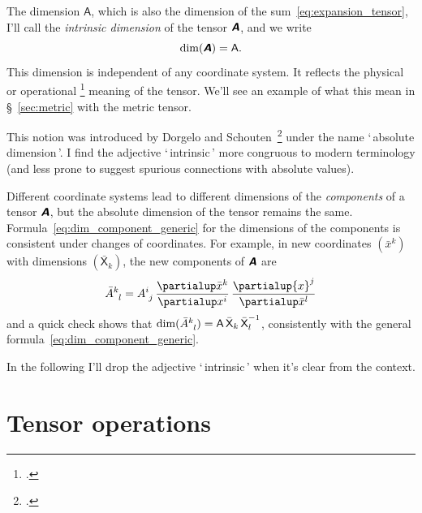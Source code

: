 \documentclass[\ifafour a4paper,12pt,\else a5paper,10pt,\fi%
onecolumn,oneside,article,%
british%
]{memoir}
\newcommand*{\defquote}[1]{`\,#1\,'}
\theoremstyle{remark}
\theoremstyle{innote}
\newcommand*{\mathte}[1]{\textbf{\textit{\textsf{#1}}}}
\newcommand*{\citep}{\footcites}
\newcommand*{\de}{\partialup}%
\renewcommand*{\|}[1][]{\nonscript\,#1\vert\nonscript\;\mathopen{}}
\newcommand*{\sect}{\S}%
\newcommand*{\sects}{\S\S}%
\newcommand*{\chap}{ch.}%
\newcommand*{\Xx}{\textsf{X}}
\newcommand*{\Aa}{\textsf{A}}
\newcommand*{\yA}{\mathte{A}}
\renewcommand*{\i}{\indices}
\begin{document}
The dimension $\Aa$, which is also the dimension of the
sum~\eqref{eq:expansion_tensor}, I'll call the \emph{intrinsic dimension}
of the tensor $\yA$, and we write
\begin{equation}
  \label{eq:abs_dim}
  \dim(\yA) = \Aa.
\end{equation}
This dimension is independent of any coordinate system.
It reflects the physical or operational
\citep{bridgman1927_r1958}[see
also][\sect~A.2]{synge1960}[\sects~A.3--4]{truesdelletal1960} meaning of
the tensor. We'll see an example of what this mean in
\sect~\ref{sec:metric} with the metric tensor.

This notion was introduced by Dorgelo and
Schouten~\citep{dorgeloetal1946}[\chap~VI]{schouten1951_r1989} under the
name \defquote{absolute dimension}. I find the adjective
\defquote{intrinsic} more congruous to modern terminology (and less prone
to suggest spurious connections with absolute values).



\medskip

Different coordinate systems lead to different dimensions of the
\emph{components} of a tensor $\yA$, but the absolute dimension of the
tensor remains the same. Formula~\eqref{eq:dim_component_generic} for the
dimensions of the components is consistent under changes of coordinates.
For example, in new coordinates $({\bar{x}}^{k})$ with dimensions
$({\bar{\Xx}}_{k})$, the new components of $\yA$ are
\begin{equation}
  \label{eq:coords_change}
  \bar{A}\i{^{k}_{l}} = A\i{^{i}_{j}}
  \,\frac{\de \bar{x}^{k}}{\de x^{i}}
  \,\frac{\de {x}^{j}}{\de \bar{x}^{l}}
\end{equation}
and a quick check shows that
$\dim(\bar{A}\i{^{k}_{l}}) = \Aa\,\bar{\Xx}_{k}\,{\bar{\Xx}_{l}}^{-1}$, consistently
with the general formula~\eqref{eq:dim_component_generic}. %

\smallskip

In the following I'll drop the adjective \defquote{intrinsic} when it's
clear from the context.

\section{Tensor operations}
\label{sec:tensor_ops}
\end{document}
